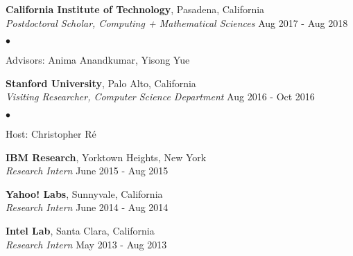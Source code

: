 \documentclass[margin,line]{res}
\newenvironment{list1}{
  \begin{list}{\ding{113}}{%
      \setlength{\itemsep}{0in}
      \setlength{\parsep}{0in} \setlength{\parskip}{0in}
      \setlength{\topsep}{0in} \setlength{\partopsep}{0in} 
      \setlength{\leftmargin}{0.17in}}}{\end{list}}
\newenvironment{list2}{
  \begin{list}{$\bullet$}{%
      \setlength{\itemsep}{0in}
      \setlength{\parsep}{0in} \setlength{\parskip}{0in}
      \setlength{\topsep}{0in} \setlength{\partopsep}{0in} 
      \setlength{\leftmargin}{0.2in}}}{\end{list}}
\begin{document}
\begin{resume}
{\bf California Institute of Technology}, Pasadena, California\\
{\em Postdoctoral Scholar,  Computing + Mathematical Sciences} \hfill {Aug 2017 - Aug 2018}

\begin{list2}
\item Advisors:  Anima Anandkumar, Yisong Yue
\end{list2}


{\bf Stanford University}, Palo Alto, California\\
{\em Visiting Researcher,  Computer Science Department} \hfill { Aug 2016 - Oct 2016}

\begin{list2}
\item Host:  Christopher R\'e
\end{list2}

{\bf  IBM  Research}, Yorktown Heights, New York\\
\vspace{-.2cm}
{\em Research Intern} \hfill {June 2015 - Aug 2015}


{\bf  Yahoo! Labs}, Sunnyvale, California\\
\vspace{-.2cm}
{\em Research Intern} \hfill { June 2014 - Aug 2014} 
%


{\bf  Intel Lab}, Santa Clara, California\\
\vspace{-.2cm}
{\em Research Intern} \hfill{May 2013 - Aug 2013}


\end{resume}
\end{document}
